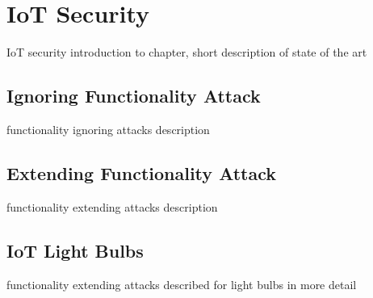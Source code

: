 \section{IoT Security}
\label{sec:iot_security}

IoT security introduction to chapter, short description of state of the art

\subsection{Ignoring Functionality Attack}
\label{sec:ignoring_func}

functionality ignoring attacks description

\subsection{Extending Functionality Attack}
\label{sec:extending_func}

functionality extending attacks description

\subsection{IoT Light Bulbs}
\label{sec:iot_bulbs}

functionality extending attacks described for light bulbs in more detail